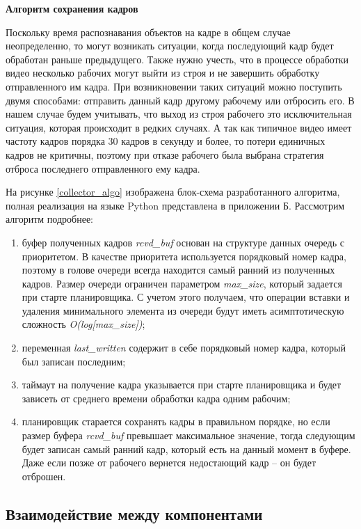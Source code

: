 \textbf{Алгоритм сохранения кадров}

Поскольку время распознавания объектов на кадре в общем случае неопределенно, то могут возникать ситуации, когда последующий кадр
будет обработан раньше предыдущего. Также нужно учесть, что в процессе обработки видео несколько рабочих могут выйти из 
строя и не завершить обработку отправленного им кадра. При возникновении таких ситуаций можно поступить двумя способами:
отправить данный кадр другому рабочему или отбросить его. В нашем случае будем учитывать, что выход из строя рабочего это
исключительная ситуация, которая происходит в редких случаях. А так как типичное видео имеет частоту кадров порядка 30 кадров
в секунду и более, то потери единичных кадров не критичны, поэтому при отказе рабочего была выбрана
стратегия отброса последнего отправленного ему кадра.

На рисунке \ref{collector_algo} изображена блок-схема разработанного алгоритма, полная реализация на языке Python 
представлена в приложении Б. Рассмотрим алгоритм подробнее:

\begin{enumerate}
\item буфер полученных кадров \emph{rcvd\_buf} основан на структуре данных очередь с приоритетом. В качестве приоритета 
используется порядковый номер кадра, поэтому в голове очереди всегда находится самый ранний из полученных кадров. Размер 
очереди ограничен параметром \emph{max\_size}, который задается при старте планировщика. С учетом этого получаем, что 
операции вставки и удаления минимального элемента из очереди будут иметь асимптотическую сложность \emph{O(log[max\_size])};
\item переменная \emph{last\_written} содержит в себе порядковый номер кадра, который был записан последним;
\item таймаут на получение кадра указывается при старте планировщика и будет зависеть от среднего времени 
обработки кадра одним рабочим;
\item планировщик старается сохранять кадры в правильном порядке, но если размер буфера \emph{rcvd\_buf} превышает
максимальное значение, тогда следующим будет записан самый ранний кадр, который есть на данный момент в буфере. Даже 
если позже от рабочего вернется недостающий кадр -- он будет отброшен.
\end{enumerate}


\subsection{Взаимодействие между компонентами}

